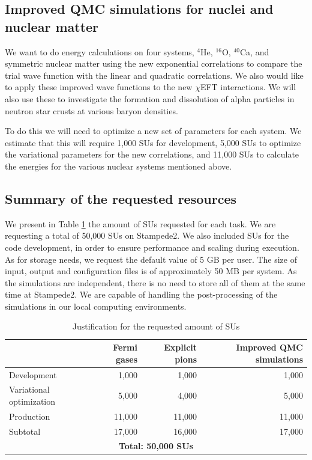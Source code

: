 \documentclass[12pt,letterpaper]{article}
\begin{document}
\subsection{Improved QMC simulations for nuclei and nuclear matter}

We want to do energy calculations on four systems, $^4$He, $^{16}$O, $^{40}$Ca, and
symmetric nuclear matter using the new exponential correlations to compare the
trial wave function with the linear and quadratic correlations. We also would like to
apply these improved wave functions to the new $\chi$EFT interactions. We will also
use these to investigate the formation and dissolution of alpha particles
in neutron star crusts at various baryon densities.

To do this we will need to optimize a
new set of parameters for each system. We estimate that this will
require 1,000 SUs for development, 5,000 SUs to optimize the variational
parameters for the new correlations, and 11,000 SUs to calculate the energies
for the various nuclear systems mentioned above.

\subsection{Summary of the requested resources}

We present in Table \ref{tab:SUs} the amount of SUs requested for each task.
We are requesting a total of 50,000 SUs on Stampede2.
We also included SUs for the code 
development, in order to ensure performance and scaling during execution.
As for storage needs, we request the default value of 5 GB per user. The size 
of input, 
output and configuration files is of approximately 50 MB per system. As the 
simulations are independent, there is no need to store all of them at the 
same time at Stampede2. We are capable of handling the post-processing of the 
simulations in our local computing environments.

\begin{table}[htbp]
\caption{Justification for the requested amount of SUs}
\begin{tabular}{|l|r|r|r|}
\hline
 & \textbf{Fermi gases} & \textbf{Explicit pions} & \textbf{Improved QMC simulations} \\ \hline
Development 			 & 1,000 & 1,000 & 1,000 \\ \hline
Variational optimization & 5,000 & 4,000 & 5,000 \\ \hline
Production 				 &11,000 & 11,000 & 11,000 \\ \hline
Subtotal 				& 17,000 & 16,000 & 17,000 \\ \hline\hline
\multicolumn{4}{|c|}{\textbf{Total: 50,000 SUs}} \\ \hline
\end{tabular}
\label{tab:SUs}
\end{table}
\end{document}
